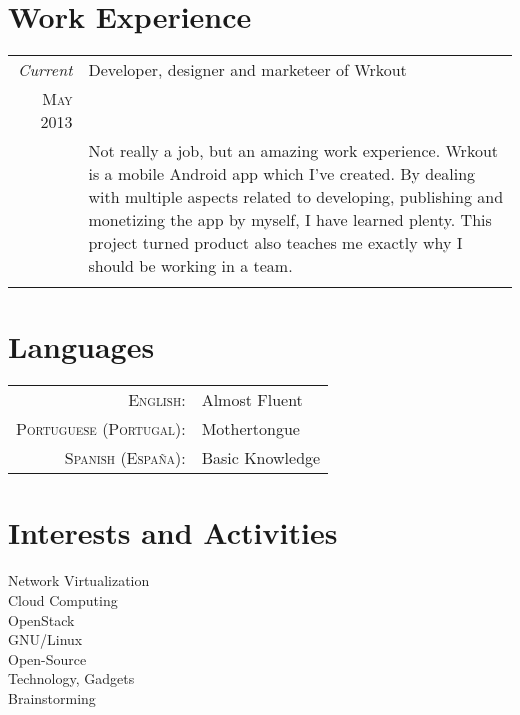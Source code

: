 \documentclass[a4paper,10pt]{article} %
\begin{document}

\section{Work Experience}

\begin{tabular}{r|p{11cm}}
	\emph{Current} & Developer, designer and marketeer of Wrkout \\
	\textsc{May 2013} & \\ 
	& \footnotesize{Not really a job, but an amazing work experience. Wrkout is a mobile Android app which I've created. By dealing with multiple aspects related to developing, publishing and monetizing the app by myself, I have learned plenty. This project turned product also teaches me exactly why I should be working in a team.}\\
	\multicolumn{2}{c}{} \\
	
\end{tabular}


\section{Languages}

\begin{tabular}{rl}
	\textsc{English:} & Almost Fluent\\
	
	\textsc{Portuguese (Portugal):} & Mothertongue\\
	
	\textsc{Spanish (España):} & Basic Knowledge\\
\end{tabular}


\section{Interests and Activities}
Network Virtualization\\
Cloud Computing\\
OpenStack\\
GNU/Linux\\
Open-Source\\
Technology, Gadgets\\
Brainstorming\\
\end{document}
